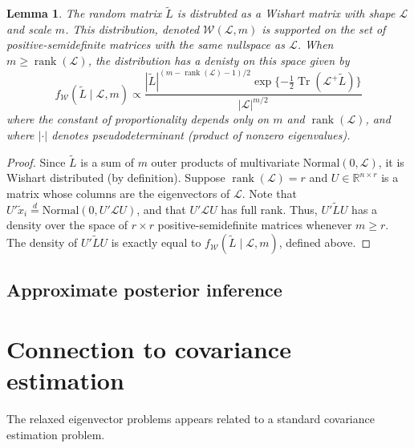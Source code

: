 \documentclass[12pt]{article}
\newcommand{\reals}{\mathbb{R}}
\DeclareMathOperator*{\Tr}{Tr}
\DeclareMathOperator*{\rank}{rank}
\theoremstyle{plain}
\newtheorem{lemma}[theorem]{Lemma}
\begin{document}
\begin{lemma}
  The random matrix $\tilde L$ is distrubted as a Wishart matrix with
  shape $\mathcal{L}$ and scale $m$.  This distribution, denoted
  $\mathcal{W}(\mathcal{L}, m)$ is supported on the set of
  positive-semidefinite matrices with the same nullspace as $\mathcal{L}$.  When
  $m \geq \rank(\mathcal{L})$, the distribution has a denisty on this space
  given by
  \[
    f_\mathcal{W}( \tilde L \mid \mathcal{L}, m)
      \propto
      \frac{|\tilde L|^{(m - \rank(\mathcal{L}) - 1)/2}
        \exp\{-\tfrac{1}{2} \Tr(\mathcal{L}^+ \tilde L) \}}
        {|\mathcal{L}|^{m/2}}
  \]
  where the constant of proportionality depends only on $m$ and $\rank(\mathcal{L})$,
  and where $|\cdot|$ denotes pseudodeterminant (product of nonzero
  eigenvalues).
\end{lemma}
\begin{proof}
  Since $\tilde L$ is a sum of $m$ outer products of multivariate
  $\mathrm{Normal}(0, \mathcal{L})$, it is Wishart distributed
  (by definition).
  Suppose $\rank(\mathcal{L}) = r$ and
  $U \in \reals^{n \times r}$ is a matrix whose columns are the
    eigenvectors of $\mathcal{L}$.  Note that
    $U' \tilde x_i \overset{d}{=} \mathrm{Normal}(0, U' \mathcal{L} U)$,
    and that $U' \mathcal{L} U$ has full rank.  Thus,
    \(
      U' \tilde L U
    \)
    has a density over the space of $r \times r$ positive-semidefinite
    matrices whenever $m \geq r$.  The density of $U' \tilde L U$ is
    exactly equal to $f_\mathcal{W}(\tilde L \mid \mathcal{L}, m)$,
    defined above.
\end{proof}


\subsection{Approximate posterior inference}




\clearpage

\section{Connection to covariance estimation}
\label{S:connection-to-covariance}

The relaxed eigenvector problems appears related to a standard covariance estimation problem.
\end{document}
